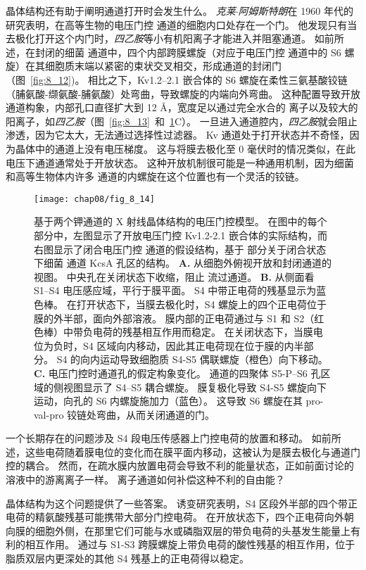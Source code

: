 晶体结构还有助于阐明通道打开时会发生什么。
\textit{克莱$\cdot$阿姆斯特朗}在 1960 年代的研究表明，在高等生物的电压门控  通道的细胞内口处存在一个门。
他发现只有当去极化打开这个内门时，\textit{四乙胺}等小有机阳离子才能进入并阻塞通道。
如前所述，在封闭的细菌  通道中，四个内部跨膜螺旋（对应于电压门控  通道中的 S6 螺旋）在其细胞质末端以紧密的束状交叉相交，形成通道的封闭门（图~\ref{fig:8_12})。
相比之下，Kv1.2–2.1 嵌合体的 S6 螺旋在柔性三氨基酸铰链（脯氨酸-缬氨酸-脯氨酸）处弯曲，导致螺旋的内端向外弯曲。
这种配置导致开放通道构象，内部孔口直径扩大到 12 Å，宽度足以通过完全水合的  离子以及较大的阳离子，如\textit{四乙胺}（图~\ref{fig:8_13}~和~\ref{fig:8_14}C）。
一旦进入通道腔内，\textit{四乙胺}就会阻止  渗透，因为它太大，无法通过选择性过滤器。
Kv 通道处于打开状态并不奇怪，因为晶体中的通道上没有电压梯度。
这与将膜去极化至 0 毫伏时的情况类似，在此电压下通道通常处于开放状态。
这种开放机制很可能是一种通用机制，因为细菌和高等生物体内许多  通道的内螺旋在这个位置也有一个灵活的铰链。


\begin{figure}[htbp]
	\centering
	\texttt{[image: chap08/fig\_8\_14]}
	\caption{基于两个钾通道的 X 射线晶体结构的电压门控模型。
		在图中的每个部分中，左图显示了开放电压门控 Kv1.2-2.1 嵌合体的实际结构，而右图显示了闭合电压门控  通道的假设结构，基于 部分关于闭合状态下细菌  通道 KcsA 孔区的结构。
		\textbf{A.} 从细胞外俯视开放和封闭通道的视图。
		中央孔在关闭状态下收缩，阻止  流过通道。
		\textbf{B.} 从侧面看 S1–S4 电压感应域，平行于膜平面。
		S4 中带正电荷的残基显示为蓝色棒。
		在打开状态下，当膜去极化时，S4 螺旋上的四个正电荷位于膜的外半部，面向外部溶液。
		膜内部的正电荷通过与 S1 和 S2（红色棒）中带负电荷的残基相互作用而稳定。
		在关闭状态下，当膜电位为负时，S4 区域向内移动，因此其正电荷现在位于膜的内半部分。
		S4 的向内运动导致细胞质 S4-S5 偶联螺旋（橙色）向下移动。
		\textbf{C.} 电压门控时通道孔的假定构象变化。
		通道的四聚体 S5-P–S6 孔区域的侧视图显示了 S4–S5 耦合螺旋。
		膜复极化导致 S4-S5 螺旋向下运动，向孔的 S6 内螺旋施加力（蓝色）。
		这导致 S6 螺旋在其 pro-val-pro 铰链处弯曲，从而关闭通道的门。}
	\label{fig:8_14}
\end{figure}


一个长期存在的问题涉及 S4 段电压传感器上门控电荷的放置和移动。
如前所述，这些电荷随着膜电位的变化而在膜平面内移动，这被认为是膜去极化与通道门控的耦合。
然而，在疏水膜内放置电荷会导致不利的能量状态，正如前面讨论的溶液中的游离离子一样。
离子通道如何补偿这种不利的自由能？


晶体结构为这个问题提供了一些答案。
诱变研究表明，S4 区段外半部的四个带正电荷的精氨酸残基可能携带大部分门控电荷。
在开放状态下，四个正电荷向外朝向膜的细胞外侧，在那里它们可能与水或磷脂双层的带负电荷的头基发生能量上有利的相互作用。
通过与 S1-S3 跨膜螺旋上带负电荷的酸性残基的相互作用，位于脂质双层内更深处的其他 S4 残基上的正电荷得以稳定。



